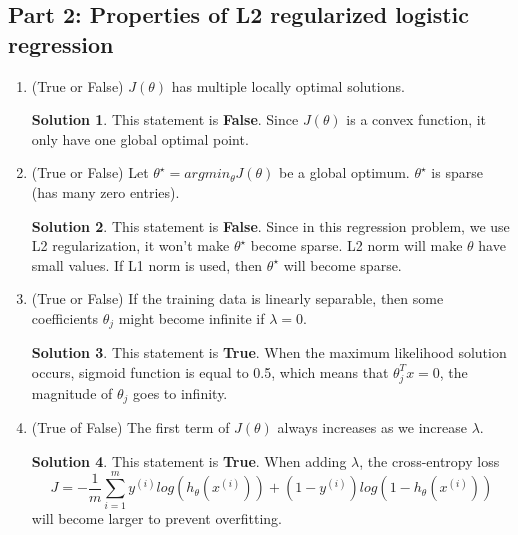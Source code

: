 \documentclass[]{book}
\theoremstyle{definition}
\newtheorem*{soln}{Solution}
\begin{document}
\subsection*{Part 2: Properties of L2 regularized logistic regression }
\begin{enumerate}
	\item (True or False) $J(\theta)$ has multiple locally optimal solutions.
	\begin{soln}
		This statement is \textbf{False}. Since $J(\theta)$ is a convex function, it only have one global optimal point.
	\end{soln}
	
	\item (True or False) Let $\theta^{\star} = argmin_{\theta}J(\theta)$ be a global optimum. $\theta^{\star}$ is sparse (has many zero entries).
	\begin{soln}
		This statement is \textbf{False}. Since in this regression problem, we use L2 regularization, it won't make $\theta^{\star}$ become sparse. L2 norm will make $\theta$ have small values. If L1 norm is used, then $\theta^{\star}$ will become sparse.
	\end{soln}
	
	\item (True or False) If the training data is linearly separable, then some coefficients $\theta_j$ might become infinite if $\lambda = 0$.
	\begin{soln}
		This statement is \textbf{True}. When the
		 maximum likelihood solution occurs, sigmoid function is equal to 0.5, which means that $ \theta_j^T x = 0 $, the magnitude of $\theta_j$ goes to infinity.
	\end{soln}
	\item (True of False) The first term of $J(\theta)$ always increases as we increase $\lambda$.
	\begin{soln}
		This statement is \textbf{True}. When adding $\lambda$, the cross-entropy loss
		$$J = - \frac{1}{m} \sum_{i = 1}^{m} y^{(i)} log(h_{\theta}(x^{(i)})) + (1-y^{(i)})log(1-h_{\theta}(x^{(i)}))$$
		will become larger to prevent overfitting.
	\end{soln}
	
\end{enumerate}
\end{document}
